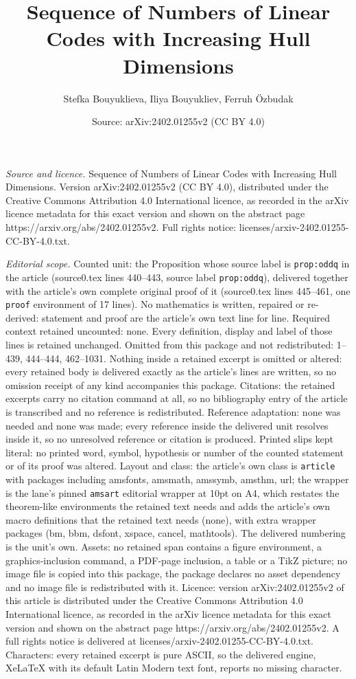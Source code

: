 \documentclass[10pt,a4paper]{amsart}
\title[Sequence of Numbers of Linear Codes with Increasing Hull Dim]{Sequence of Numbers of Linear Codes with Increasing Hull Dimensions}
\author{Stefka Bouyuklieva, Iliya Bouyukliev, Ferruh \"Ozbudak}
\date{Source: arXiv:2402.01255v2 (CC BY 4.0)}
\begin{document}
\maketitle

\noindent\emph{Source and licence.} Sequence of Numbers of Linear Codes with Increasing Hull Dimensions. Version arXiv:2402.01255v2 (CC BY 4.0), distributed under the Creative Commons Attribution 4.0 International licence, as recorded in the arXiv licence metadata for this exact version and shown on the abstract page https://arxiv.org/abs/2402.01255v2. Full rights notice: licenses/arxiv-2402.01255-CC-BY-4.0.txt.\par\smallskip

\noindent\textit{Editorial scope.} Counted unit: the Proposition whose source label is \texttt{prop:oddq} in the article (source0.tex lines 440--443, source label \texttt{prop:oddq}), delivered together with the article's own complete original proof of it (source0.tex lines 445--461, one \texttt{proof} environment of 17 lines). No mathematics is written, repaired or re-derived: statement and proof are the article's own text line for line. Required context retained uncounted: none. Every definition, display and label of those lines is retained unchanged. Omitted from this package and not redistributed: 1--439, 444--444, 462--1031. Nothing inside a retained excerpt is omitted or altered: every retained body is delivered exactly as the article's lines are written, so no omission receipt of any kind accompanies this package. Citations: the retained excerpts carry no citation command at all, so no bibliography entry of the article is transcribed and no reference is redistributed. Reference adaptation: none was needed and none was made; every reference inside the delivered unit resolves inside it, so no unresolved reference or citation is produced. Printed slips kept literal: no printed word, symbol, hypothesis or number of the counted statement or of its proof was altered. Layout and class: the article's own class is \texttt{article} with packages including amsfonts, amsmath, amssymb, amsthm, url; the wrapper is the lane's pinned \texttt{amsart} editorial wrapper at 10pt on A4, which restates the theorem-like environments the retained text needs and adds the article's own macro definitions that the retained text needs (none), with extra wrapper packages (bm, bbm, dsfont, xspace, cancel, mathtools). The delivered numbering is the unit's own. Assets: no retained span contains a figure environment, a graphics-inclusion command, a PDF-page inclusion, a table or a TikZ picture; no image file is copied into this package, the package declares no asset dependency and no image file is redistributed with it. Licence: version arXiv:2402.01255v2 of this article is distributed under the Creative Commons Attribution 4.0 International licence, as recorded in the arXiv licence metadata for this exact version and shown on the abstract page https://arxiv.org/abs/2402.01255v2. A full rights notice is delivered at licenses/arxiv-2402.01255-CC-BY-4.0.txt. Characters: every retained excerpt is pure ASCII, so the delivered engine, XeLaTeX with its default Latin Modern text font, reports no missing character.
\end{document}
